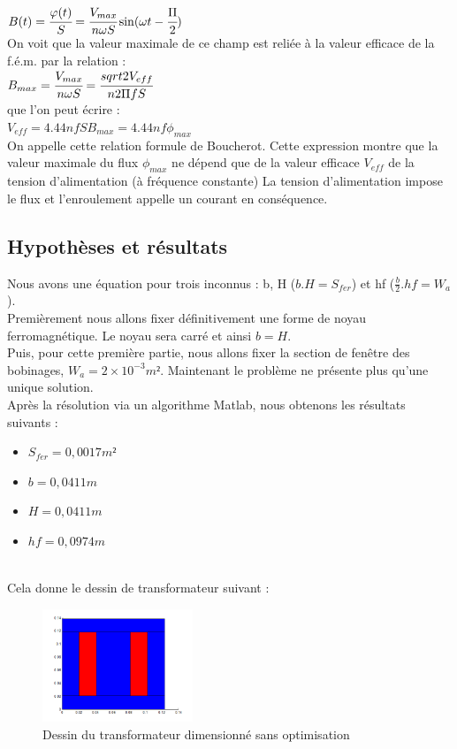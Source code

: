 $B(t) =  \cfrac{\varphi(t)}{S} = \cfrac{V_{max}}{n\omega S}\sin(\omega{}t - \cfrac{\Pi}{2})$\\


On voit que la valeur maximale de ce champ est reliée à la valeur efficace de la f.é.m. par la relation :\\

$B_{max} =  \cfrac{V_{max}}{n\omega S} = \cfrac{sqrt{2}V_{eff}}{n 2\Pi f S}$ \\

que l'on peut écrire : \\

$V_{eff} = 4.44 n f S B_{max} = 4.44 n f \phi_{max}$\\


On appelle cette relation formule de Boucherot. Cette expression montre que la valeur maximale du flux $\phi_{max}$ ne dépend que de la valeur efficace $V_{eff} $ de la tension d'alimentation (à fréquence constante) La tension d'alimentation impose le flux et l'enroulement appelle un courant en conséquence. 

	
\subsection{Hypothèses et résultats}
Nous avons une équation pour trois inconnus : b, H ($b.H = S_{fer}$) et hf ($\frac{b}{2}.hf = W_a$).\\
Premièrement nous allons fixer définitivement une forme de noyau ferromagnétique. Le noyau sera carré et ainsi $b = H$.\\
Puis, pour cette première partie, nous allons fixer la section de fenêtre des bobinages, $W_a = 2\times{}10^{-3} m²$.
Maintenant le problème ne présente plus qu'une unique solution.\\

\newpage
Après la résolution via un algorithme Matlab, nous obtenons les résultats suivants : \\
\begin{itemize}
\item $S_{fer} = 0,0017 m² $
\item $b = 0,0411 m $
\item $H = 0,0411 m $
\item $hf = 0,0974 m $
\end{itemize}~\\

Cela donne le dessin de transformateur suivant :
\begin{figure}[h]
	\begin{center}
	\includegraphics[width=0.4\textwidth]{images/TP1_transfo_carre}
	\caption{Dessin du transformateur dimensionné sans optimisation}\label{img:dessinTransfoCarre}
	\end{center}
\end{figure}
\FloatBarrier 

